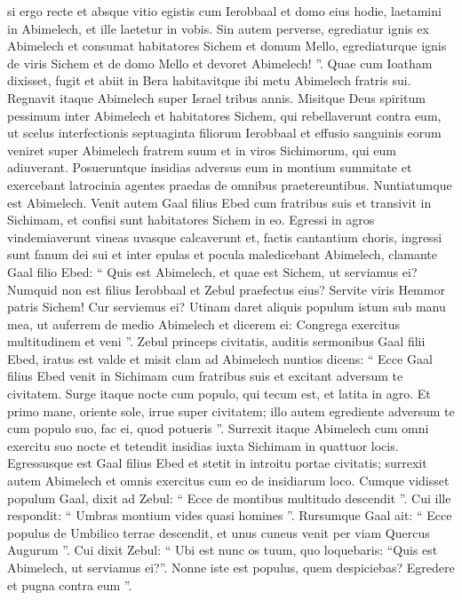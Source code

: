 \begin{biblechapter}
\begin{biblechapter}
\begin{biblechapter}
\begin{biblechapter}
\begin{biblechapter}
\begin{biblechapter}
\begin{biblechapter}
\begin{biblechapter}
\begin{biblechapter}
\verse si ergo recte et absque vitio egistis cum Ierobbaal et domo eius hodie, laetamini in Abimelech, et ille laetetur in vobis. 
\verse Sin autem perverse, egrediatur ignis ex Abimelech et consumat habitatores Sichem et domum Mello, egrediaturque ignis de viris Sichem et de domo Mello et devoret Abimelech! ”. 
\verse Quae cum Ioatham dixisset, fugit et abiit in Bera habitavitque ibi metu Abimelech fratris sui.
 \verse Regnavit itaque Abimelech super Israel tribus annis. 
\verse Misitque Deus spiritum pessimum inter Abimelech et habitatores Sichem, qui rebellaverunt contra eum, 
\verse ut scelus interfectionis septuaginta filiorum Ierobbaal et effusio sanguinis eorum veniret super Abimelech fratrem suum et in viros Sichimorum, qui eum adiuverant. 
\verse Posueruntque insidias adversus eum in montium summitate et exercebant latrocinia agentes praedas de omnibus praetereuntibus. Nuntiatumque est Abimelech.
 \verse Venit autem Gaal filius Ebed cum fratribus suis et transivit in Sichimam, et confisi sunt habitatores Sichem in eo. 
\verse Egressi in agros vindemiaverunt vineas uvasque calcaverunt et, factis cantantium choris, ingressi sunt fanum dei sui et inter epulas et pocula maledicebant Abimelech, 
\verse clamante Gaal filio Ebed: “ Quis est Abimelech, et quae est Sichem, ut serviamus ei? Numquid non est filius Ierobbaal et Zebul praefectus eius? Servite viris Hemmor patris Sichem! Cur serviemus ei? 
\verse Utinam daret aliquis populum istum sub manu mea, ut auferrem de medio Abimelech et dicerem ei: Congrega exercitus multitudinem et veni ”.
 \verse Zebul princeps civitatis, auditis sermonibus Gaal filii Ebed, iratus est valde 
\verse et misit clam ad Abimelech nuntios dicens: “ Ecce Gaal filius Ebed venit in Sichimam cum fratribus suis et excitant adversum te civitatem. 
\verse Surge itaque nocte cum populo, qui tecum est, et latita in agro. 
\verse Et primo mane, oriente sole, irrue super civitatem; illo autem egrediente adversum te cum populo suo, fac ei, quod potueris ”.
 \verse Surrexit itaque Abimelech cum omni exercitu suo nocte et tetendit insidias iuxta Sichimam in quattuor locis. 
\verse Egressusque est Gaal filius Ebed et stetit in introitu portae civitatis; surrexit autem Abimelech et omnis exercitus cum eo de insidiarum loco. 
\verse Cumque vidisset populum Gaal, dixit ad Zebul: “ Ecce de montibus multitudo descendit ”. Cui ille respondit: “ Umbras montium vides quasi homines ”. 
\verse Rursumque Gaal ait: “ Ecce populus de Umbilico terrae descendit, et unus cuneus venit per viam Quercus Augurum ”. 
\verse Cui dixit Zebul: “ Ubi est nunc os tuum, quo loquebaris: “Quis est Abimelech, ut serviamus ei?”. Nonne iste est populus, quem despiciebas? Egredere et pugna contra eum ”. 

\end{biblechapter}
\end{biblechapter}
\end{biblechapter}
\end{biblechapter}
\end{biblechapter}
\end{biblechapter}
\end{biblechapter}
\end{biblechapter}
\end{biblechapter}
